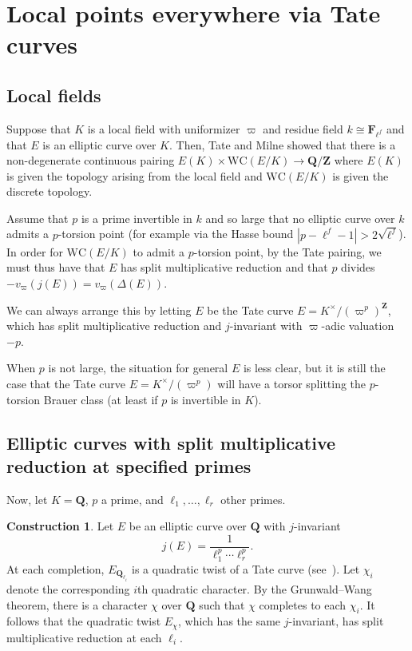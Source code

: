 \documentclass[10pt,letterpaper,twoside]{article}
\renewcommand{\1}{\mathbf{1}}
\newcommand{\bF}{\mathbf{F}}
\newcommand{\bQ}{\mathbf{Q}}
\newcommand{\bZ}{\mathbf{Z}}
\newcommand{\WC}{\mathrm{WC}}
\newcommand{\iso}{\cong}
\theoremstyle{plain}
\theoremstyle{plain}
\theoremstyle{definition}
\theoremstyle{named}
\theoremstyle{definition}
\newtheorem{construction}[theorem]{Construction}
\begin{document}
	
	
	\section{Local points everywhere via Tate curves}
	
	\subsection{Local fields}
	
	Suppose that $K$ is a local field with uniformizer $\varpi$ and residue field $k\iso\bF_{\ell^f}$ and that $E$ is an elliptic curve over $K$. Then, Tate and Milne 
	showed that there is a non-degenerate continuous pairing $E(K)\times\WC(E/K)\rightarrow\bQ/\bZ$
	where $E(K)$ is given the topology arising from the local field and $\WC(E/K)$ is given the discrete
	topology.
	
	Assume that $p$ is a prime invertible in $k$ and so large that no elliptic curve over $k$ admits
	a $p$-torsion point (for example via the Hasse bound $|p-\ell^f-1|>2\sqrt{\ell^f}$).
	In order for $\WC(E/K)$ to admit a $p$-torsion point, by the Tate pairing, we must thus have that
	$E$ has split multiplicative
	reduction and that $p$ divides $-v_{\varpi}(j(E))=v_\varpi(\Delta(E))$.
	
	We can always arrange this by letting $E$ be the Tate curve
	$E=K^\times/(\varpi^p)^{\bZ}$, which has split multiplicative reduction
	and $j$-invariant with $\varpi$-adic valuation $-p$.
	
	When $p$ is not large, the situation for general $E$ is less clear, but it is still the case that the Tate curve
	$E=K^\times/(\varpi^p)$ will have a torsor splitting the $p$-torsion Brauer class (at least if $p$
	is invertible in $K$).
	
	
	
	\subsection{Elliptic curves with split multiplicative reduction at specified primes}
	
	Now, let $K=\bQ$, $p$ a prime, and $\ell_1,\ldots,\ell_r$ other primes.
	
	\begin{construction}\label{const:multiplicative}
		Let $E$ be an elliptic curve over $\bQ$ with $j$-invariant
		$$j(E)=\frac{1}{\ell_1^p\cdots\ell_r^p}.$$
		At each completion, $E_{\bQ_{\ell_i}}$ is a quadratic twist of a Tate curve
		(see~\cite[Thm.~C.14.1]{silverman}). Let $\chi_i$ denote the corresponding $i$th quadratic character. By the
		Grunwald--Wang theorem, there is a character $\chi$ over $\bQ$ such that $\chi$ completes to
		each $\chi_i$. It follows that the quadratic twist $E_\chi$, which has the same $j$-invariant,
		has split multiplicative reduction at each $\ell_i$.
	\end{construction}
	
\end{document}
